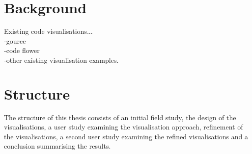 

\section{Background}

Existing code visualisations...\\
-gource \cite{Caudwell2010}\\
-code flower\\
-other existing visualisation examples.\\

\section{Structure}

The structure of this thesis consists of an initial field study, the design of the visualisations, a user study examining the visualisation approach, refinement of the visualisations, a second user study examining the refined visualisations and a conclusion summarising the results.




